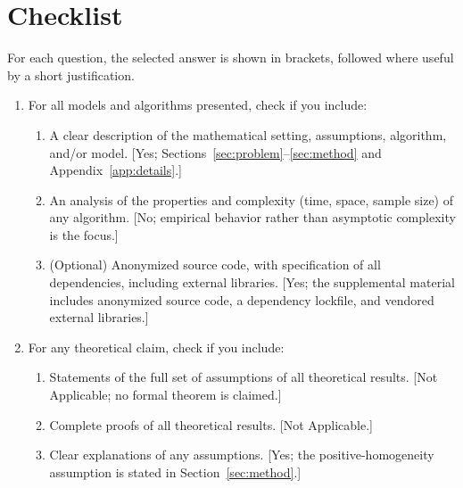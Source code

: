 \documentclass[twoside]{article}
\begin{document}



\section*{Checklist}

For each question, the selected answer is shown in brackets, followed where
useful by a short justification.

\begin{enumerate}
  \item For all models and algorithms presented, check if you include:
  \begin{enumerate}
    \item A clear description of the mathematical setting, assumptions,
    algorithm, and/or model. [Yes; Sections~\ref{sec:problem}--\ref{sec:method}
    and Appendix~\ref{app:details}.]
    \item An analysis of the properties and complexity (time, space, sample
    size) of any algorithm. [No; empirical behavior rather than asymptotic
    complexity is the focus.]
    \item (Optional) Anonymized source code, with specification of all
    dependencies, including external libraries. [Yes; the supplemental
    material includes anonymized source code, a dependency lockfile, and
    vendored external libraries.]
  \end{enumerate}

  \item For any theoretical claim, check if you include:
  \begin{enumerate}
    \item Statements of the full set of assumptions of all theoretical results.
    [Not Applicable; no formal theorem is claimed.]
    \item Complete proofs of all theoretical results. [Not Applicable.]
    \item Clear explanations of any assumptions. [Yes; the positive-homogeneity
    assumption is stated in Section~\ref{sec:method}.]
  \end{enumerate}


\end{enumerate}
\end{document}
